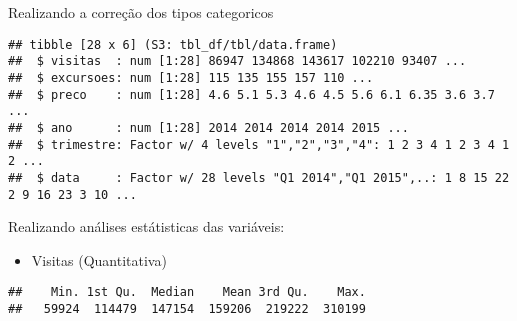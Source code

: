 \documentclass[
]{article}
\newenvironment{Shaded}{\begin{snugshade}}{\end{snugshade}}
\newcommand{\CommentTok}[1]{\textcolor[rgb]{0.56,0.35,0.01}{\textit{#1}}}
\newcommand{\FloatTok}[1]{\textcolor[rgb]{0.00,0.00,0.81}{#1}}
\newcommand{\FunctionTok}[1]{\textcolor[rgb]{0.00,0.00,0.00}{#1}}
\newcommand{\NormalTok}[1]{#1}
\newcommand{\OtherTok}[1]{\textcolor[rgb]{0.56,0.35,0.01}{#1}}
\newcommand{\SpecialCharTok}[1]{\textcolor[rgb]{0.00,0.00,0.00}{#1}}
\providecommand{\tightlist}{%
  \setlength{\itemsep}{0pt}\setlength{\parskip}{0pt}}
\begin{document}
Realizando a correção dos tipos categoricos

\begin{Shaded}
\end{Shaded}

\begin{verbatim}
## tibble [28 x 6] (S3: tbl_df/tbl/data.frame)
##  $ visitas  : num [1:28] 86947 134868 143617 102210 93407 ...
##  $ excursoes: num [1:28] 115 135 155 157 110 ...
##  $ preco    : num [1:28] 4.6 5.1 5.3 4.6 4.5 5.6 6.1 6.35 3.6 3.7 ...
##  $ ano      : num [1:28] 2014 2014 2014 2014 2015 ...
##  $ trimestre: Factor w/ 4 levels "1","2","3","4": 1 2 3 4 1 2 3 4 1 2 ...
##  $ data     : Factor w/ 28 levels "Q1 2014","Q1 2015",..: 1 8 15 22 2 9 16 23 3 10 ...
\end{verbatim}

Realizando análises estátisticas das variáveis:

\begin{itemize}
\tightlist
\item
  Visitas (Quantitativa)
\end{itemize}

\begin{Shaded}
\end{Shaded}

\begin{verbatim}
##    Min. 1st Qu.  Median    Mean 3rd Qu.    Max. 
##   59924  114479  147154  159206  219222  310199
\end{verbatim}

\begin{Shaded}
\end{Shaded}
\end{document}
